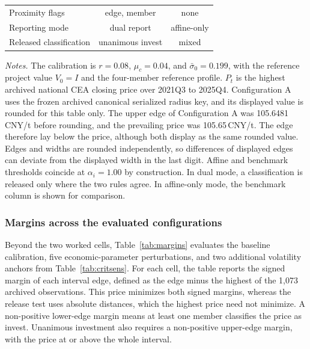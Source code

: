 \documentclass[5p,times,authoryear]{elsarticle}
\theoremstyle{plain}
\newcommand{\sbar}{\bar{\sigma}_0}
\begin{document}
\begin{table}[!t]
\begin{tabular}{@{}lcccc@{}}
Proximity flags & \multicolumn{2}{c}{edge, member} & \multicolumn{2}{c}{none}\\
Reporting mode & \multicolumn{2}{c}{dual report} & \multicolumn{2}{c}{affine-only}\\
Released classification & \multicolumn{2}{c}{unanimous invest} & \multicolumn{2}{c}{mixed}\\
\bottomrule
\end{tabular}
\par\smallskip
\parbox{0.95\textwidth}{\footnotesize\emph{Notes.} The calibration is $r=0.08$, $\mu_c=0.04$, and $\sbar=0.199$, with the reference project value $V_0=I$ and the four-member reference profile. $P_t$ is the highest archived national CEA closing price over 2021Q3 to 2025Q4. Configuration A uses the frozen archived canonical serialized radius key, and its displayed value is rounded for this table only. The upper edge of Configuration A was 105.6481\,CNY/t before rounding, and the prevailing price was 105.65\,CNY/t. The edge therefore lay below the price, although both display as the same rounded value. Edges and widths are rounded independently, so differences of displayed edges can deviate from the displayed width in the last digit. Affine and benchmark thresholds coincide at $\alpha_i=1.00$ by construction. In dual mode, a classification is released only where the two rules agree. In affine-only mode, the benchmark column is shown for comparison.}
\end{table}

\subsubsection{Margins across the evaluated configurations}

Beyond the two worked cells, Table~\ref{tab:margins} evaluates the baseline calibration, five economic-parameter perturbations, and two additional volatility anchors from Table~\ref{tab:critsens}. For each cell, the table reports the signed margin of each interval edge, defined as the edge minus the highest of the 1,073 archived observations. This price minimizes both signed margins, whereas the release test uses absolute distances, which the highest price need not minimize. A non-positive lower-edge margin means at least one member classifies the price as invest. Unanimous investment also requires a non-positive upper-edge margin, with the price at or above the whole interval.
\end{document}
